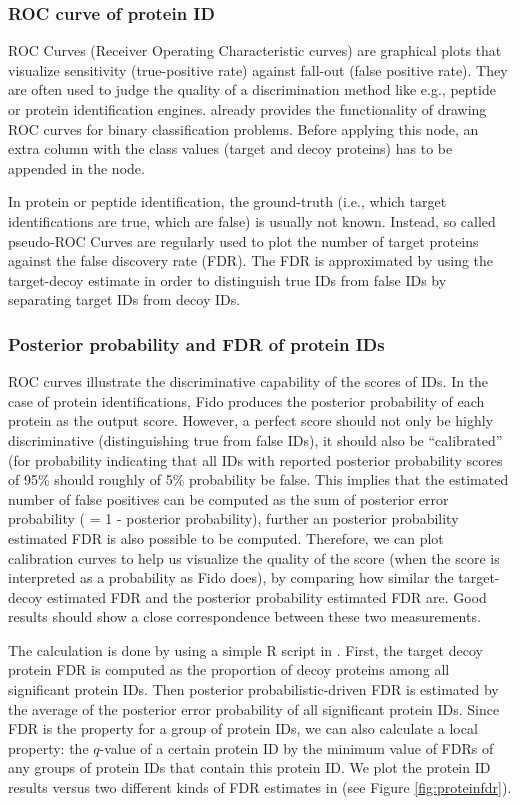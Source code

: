 \subsubsection{ROC curve of protein ID}

ROC Curves (Receiver Operating Characteristic curves) are graphical plots that visualize sensitivity (true-positive rate) 
against fall-out (false positive rate). They are often used to judge the quality of a discrimination method like e.g., 
peptide or protein identification engines. 
 already provides the functionality of drawing ROC curves for binary classification problems. 
Before applying this node, an extra column with the class values (target and decoy proteins) has to be appended in 
the  node. 

In protein or peptide identification, the ground-truth (i.e., which target identifications are true, which are false) is usually not known. Instead, so called pseudo-ROC Curves are regularly used to plot the number of target proteins against the false discovery rate (FDR). 
The FDR is approximated by using the target-decoy estimate in order to distinguish
true IDs from false IDs by separating target IDs from decoy IDs.

\subsubsection{Posterior probability and FDR of protein IDs}
ROC curves illustrate the discriminative capability of the scores of IDs. 
In the case of protein identifications, Fido produces the posterior probability of each protein as the output score.
However, a perfect score should not only be highly discriminative (distinguishing true from false IDs), 
it should also be ``calibrated'' (for probability indicating that all IDs with reported posterior probability scores of 95\% 
should roughly of 5\% probability be false. This implies that the estimated number of false positives can be computed as the sum
of posterior error probability ( = 1 - posterior probability), further an posterior probability estimated FDR is also possible to be computed. 
Therefore, we can plot calibration curves to help us visualize the
quality of the score (when the score is interpreted as a probability as Fido does), by comparing how similar the target-decoy estimated FDR and the posterior probability estimated FDR are. Good results should show a close correspondence between these two measurements. 

The calculation is done by using a simple R script in . 
First, the target decoy protein FDR is computed as the proportion of decoy proteins among all significant protein IDs. 
Then posterior probabilistic-driven FDR is estimated by the average of the posterior error probability of all significant protein IDs. Since FDR is the property for a group of protein IDs, we can also calculate a local property: the $q$-value of a certain protein ID by the minimum value of FDRs of any groups of protein IDs that contain this protein ID. 
We plot the protein ID results versus two different kinds of FDR estimates in  (see Figure \ref{fig:proteinfdr}).

